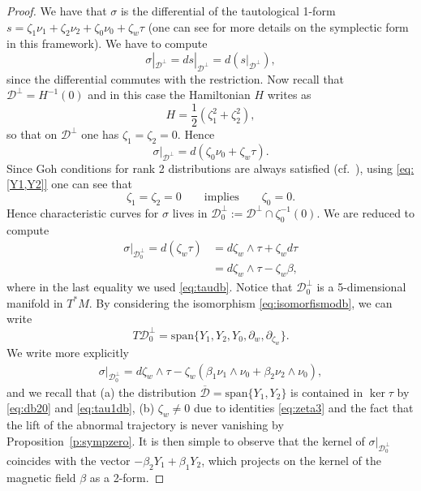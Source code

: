 \documentclass{amsart}
\theoremstyle{plain}
\theoremstyle{definition}
\theoremstyle{remark}
\newcommand{\distr}{\mathcal{D}}								%
\newcommand{\lift}[1]{\overline{#1}} 							%
\begin{document}
\begin{proof}
We have that $\sigma$ is the differential of the tautological 1-form $s=\zeta_{1}\nu_{1}+\zeta_{2}\nu_{2}+\zeta_{0}\nu_{0}+\zeta_{w}\tau$ (one can see  \cite[Section~4.2]{thebook} for more details on the symplectic form in this framework). We have to compute
 $$\sigma|_{\distr^{\perp}}=ds|_{\distr^{\perp}}=d\left(s|_{\distr^{\perp}}\right),$$
since the differential commutes with the restriction. Now recall that $\distr^{\perp}=H^{-1}(0)$ and in this case the Hamiltonian $H$ writes as
$$H=\frac{1}{2}(\zeta_{1}^{2}+\zeta^{2}_{2}),$$
so that on $\distr^{\perp}$ one has $\zeta_{1}=\zeta_{2}=0$. Hence
$$\sigma|_{\distr^{\perp}}=d\left(\zeta_{0}\nu_{0}+\zeta_{w}\tau\right).$$
Since Goh conditions for rank 2 distributions are always satisfied (cf.~\cite[Section~12.4]{thebook}), using \eqref{eq:[Y1,Y2]} one can see that
\begin{equation}\label{eq:zeta3}
\zeta_{1}=\zeta_{2}=0 \qquad \text{implies} \qquad \zeta_{0}=0.
\end{equation} 
Hence characteristic curves for $\sigma$ lives in $\distr_{0}^{\perp}:=\distr^{\perp}\cap \zeta_{0}^{-1}(0)$. We are reduced to compute \begin{align*}
\sigma|_{\distr_{0}^{\perp}}=d\left(\zeta_{w}\tau\right)&=d\zeta_{w}\wedge \tau+\zeta_{w}d\tau\\
&=d\zeta_{w}\wedge \tau-\zeta_{w}\beta,
\end{align*}
where in the last equality we used \eqref{eq:taudb}.
Notice that $\distr_{0}^{\perp}$ is a 5-dimensional manifold in $T^{*}M$. By considering the isomorphism \eqref{eq:isomorfismodb},
we can write
$$T\distr_{0}^{\perp}=\mathrm{span}\{Y_{1},Y_{2},Y_{0},\partial_{w},\partial_{\zeta_{w}}\}.$$
We write more explicitly
\begin{align*}
\sigma|_{\distr_{0}^{\perp}}=d\zeta_{w}\wedge \tau-\zeta_{w}(\beta_{1}\nu_{1}\wedge \nu_{0}+\beta_{2}\nu_{2}\wedge \nu_{0}),
\end{align*}
and we recall that (a) the distribution $\lift \distr=\mathrm{span}\{Y_{1},Y_{2}\}$ is contained in $\ker \tau$ by \eqref{eq:db20} and \eqref{eq:tau1db}, (b) $\zeta_{w}\neq 0$ due to identities \eqref{eq:zeta3} and the fact that the lift of the abnormal trajectory is never vanishing by Proposition~\ref{p:sympzero}. It is then simple to observe that the kernel of $\sigma|_{\distr_{0}^{\perp}}$ coincides with the vector $-\beta_{2}Y_{1}+\beta_{1}Y_{2}$, which projects on the kernel of the magnetic field $\beta$ as a 2-form.
\end{proof}
\end{document}
